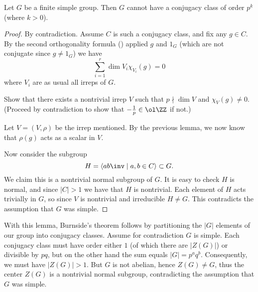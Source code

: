 \begin{lemma}
	Let $G$ be a finite simple group.
	Then $G$ cannot have a conjugacy class of order $p^k$ (where $k > 0$).
\end{lemma}
\begin{proof}
	By contradiction.
	Assume $C$ is such a conjugacy class, and fix any $g \in C$.
	By the second orthogonality formula ()
	applied $g$ and $1_G$ (which are not conjugate since $g \neq 1_G$) we have
	\[ \sum_{i=1}^r \dim V_i \chi_{V_i}(g) = 0 \]
	where $V_i$ are as usual all irreps of $G$.
	\begin{exercise}
		Show that there exists a nontrivial irrep $V$
		such that $p \nmid \dim V$ and $\chi_V(g) \neq 0$.
		(Proceed by contradiction to show that $-\frac1p \in \ol\ZZ$ if not.)
	\end{exercise}
	Let $V = (V, \rho)$ be the irrep mentioned.
	By the previous lemma, we now know that $\rho(g)$ acts as a scalar in $V$.

	Now consider the subgroup
	\[ H = \left< ab\inv \mid a,b \in C \right> \subset G. \]
	We claim this is a nontrivial normal subgroup of $G$.
	It is easy to check $H$ is normal,
	and since $|C| > 1$ we have that $H$ is nontrivial.
	Each element of $H$ acts trivially in $G$,
	so since $V$ is nontrivial and irreducible $H \neq G$.
	This contradicts the assumption that $G$ was simple.
\end{proof}

With this lemma, Burnside's theorem follows by partitioning
the $|G|$ elements of our group into conjugacy classes.
Assume for contradiction $G$ is simple.
Each conjugacy class must have order either $1$ (of which there are $|Z(G)|$)
or divisible by $pq$, but on the other hand the sum equals $|G| = p^aq^b$.
Consequently, we must have $|Z(G)| > 1$.
But $G$ is not abelian, hence $Z(G) \neq G$,
thus the center $Z(G)$ is a nontrivial normal subgroup,
contradicting the assumption that $G$ was simple.




